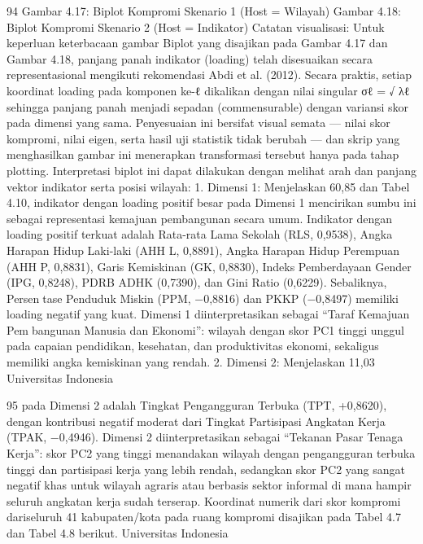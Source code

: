 94
Gambar 4.17: Biplot Kompromi Skenario 1
(Host = Wilayah)
Gambar 4.18: Biplot Kompromi Skenario
2 (Host = Indikator)
Catatan visualisasi: Untuk keperluan keterbacaan gambar Biplot yang disajikan pada
Gambar 4.17 dan Gambar 4.18, panjang panah indikator (loading) telah disesuaikan
secara representasional mengikuti rekomendasi Abdi et al. (2012). Secara praktis, setiap
koordinat loading pada komponen ke-ℓ dikalikan dengan nilai singular σℓ =
√
λℓ sehingga
panjang panah menjadi sepadan (commensurable) dengan variansi skor pada dimensi yang
sama. Penyesuaian ini bersifat visual semata — nilai skor kompromi, nilai eigen, serta
hasil uji statistik tidak berubah — dan skrip yang menghasilkan gambar ini menerapkan
transformasi tersebut hanya pada tahap plotting.
Interpretasi biplot ini dapat dilakukan dengan melihat arah dan panjang vektor indikator
serta posisi wilayah:
1. Dimensi 1: Menjelaskan 60,85%
dan Tabel 4.10, indikator dengan loading positif besar pada Dimensi 1 mencirikan
sumbu ini sebagai representasi kemajuan pembangunan secara umum. Indikator
dengan loading positif terkuat adalah Rata-rata Lama Sekolah (RLS, 0,9538), Angka
Harapan Hidup Laki-laki (AHH L, 0,8891), Angka Harapan Hidup Perempuan
(AHH P, 0,8831), Garis Kemiskinan (GK, 0,8830), Indeks Pemberdayaan Gender
(IPG, 0,8248), PDRB ADHK (0,7390), dan Gini Ratio (0,6229). Sebaliknya, Persentase Penduduk Miskin (PPM, −0,8816) dan PKKP (−0,8497) memiliki loading
negatif yang kuat. Dimensi 1 diinterpretasikan sebagai “Taraf Kemajuan Pembangunan Manusia dan Ekonomi”: wilayah dengan skor PC1 tinggi unggul pada
capaian pendidikan, kesehatan, dan produktivitas ekonomi, sekaligus memiliki angka
kemiskinan yang rendah.
2. Dimensi 2: Menjelaskan 11,03%
Universitas Indonesia

95
pada Dimensi 2 adalah Tingkat Pengangguran Terbuka (TPT, +0,8620), dengan
kontribusi negatif moderat dari Tingkat Partisipasi Angkatan Kerja (TPAK, −0,4946).
Dimensi 2 diinterpretasikan sebagai “Tekanan Pasar Tenaga Kerja”: skor PC2
yang tinggi menandakan wilayah dengan pengangguran terbuka tinggi dan partisipasi
kerja yang lebih rendah, sedangkan skor PC2 yang sangat negatif khas untuk wilayah
agraris atau berbasis sektor informal di mana hampir seluruh angkatan kerja sudah
terserap.
Koordinat numerik dari skor kompromi dariseluruh 41 kabupaten/kota pada ruang
kompromi disajikan pada Tabel 4.7 dan Tabel 4.8 berikut.
Universitas Indonesia

